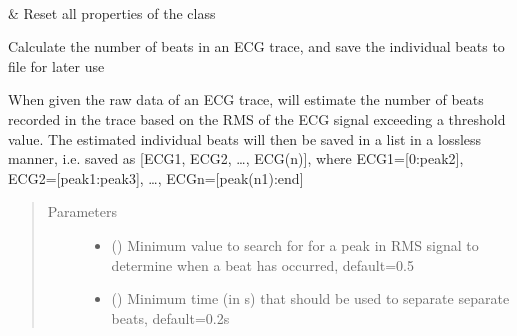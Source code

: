 \documentclass[letterpaper,10pt,english]{sphinxmanual}
\begin{document}
\begin{fulllineitems}
\begin{savenotes}
\begin{longtable}[c]{}
\\
\hline
\sphinxAtStartPar
{\hyperref[\detokenize{_autosummary/signalanalysis.ecg.Ecg:signalanalysis.ecg.Ecg.reset}]{}}
&
\sphinxAtStartPar
Reset all properties of the class
\\
\hline
\end{longtable}\sphinxatlongtableend\end{savenotes}

\begin{fulllineitems}
\label{\detokenize{_autosummary/signalanalysis.ecg.Ecg:id0}}
\sphinxAtStartPar
Calculate the number of beats in an ECG trace, and save the individual beats to file for later use

\sphinxAtStartPar
When given the raw data of an ECG trace, will estimate the number of beats recorded in the trace based on the
RMS of the ECG signal exceeding a threshold value. The estimated individual beats will then be saved in a
list in a lossless manner, i.e. saved as {[}ECG1, ECG2, …, ECG(n){]}, where ECG1={[}0:peak2{]}, ECG2={[}peak1:peak3{]},
…, ECGn={[}peak(n\sphinxhyphen{}1):end{]}
\begin{quote}\begin{description}
\item[{Parameters}] \leavevmode\begin{itemize}
\item {} 
\sphinxAtStartPar
{} () \textendash{} Minimum value to search for for a peak in RMS signal to determine when a beat has occurred, default=0.5

\item {} 
\sphinxAtStartPar
{} () \textendash{} Minimum time (in s) that should be used to separate separate beats, default=0.2s


\end{itemize}
\end{description}
\end{quote}
\end{fulllineitems}
\end{fulllineitems}
\end{document}
